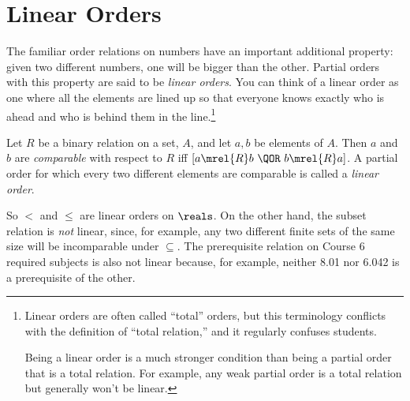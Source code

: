 \section{Linear Orders}\label{linear_order_sec}

The familiar order relations on numbers have an important additional
property: given two different numbers, one will be bigger than the
other.  Partial orders with this property are said to be \emph{linear
  orders}.  You can think of a linear order as one where all the
elements are lined up so that everyone knows exactly who is ahead and
who is behind them in the line.\footnote{Linear orders are often
  called ``total'' orders, but this terminology conflicts with the
  definition of ``total relation,'' and it regularly confuses
  students.

  Being a linear order is a much stronger condition than being a
  partial order that is a total relation.  For example, any weak
  partial order is a total relation but generally won't be linear.}

\begin{definition}\label{def:path_total}
Let $R$ be a binary relation on a set, $A$, and let $a, b$ be elements of
$A$.  Then $a$ and $b$ are \emph{comparable} with respect to $R$ iff $[a
  \mrel{R} b\ \QOR\ b \mrel{R} a]$.  A partial order for which every two
different elements are comparable is called a \emph{linear order}.
\end{definition}

So $<$ and $\le$ are linear orders on $\reals$.  On the other hand, the
subset relation is \emph{not} linear, since, for example, any two different
finite sets of the same size will be incomparable under $\subseteq$.  The
prerequisite relation on Course 6 required subjects is also not linear
because, for example, neither 8.01 nor 6.042 is a prerequisite of the
other.

\iffalse
The name linear is based on the following
\begin{lemma}\label{path_total_lem} For any
  finite, nonempty set of vertices from a linear order, there is
  a directed path going through exactly these vertices.  If
  the digraph is a DAG, the directed path is unique.
\end{lemma}
Lemma~\ref{path_total_lem} is easy to prove by induction on the size
of the set of vertices.  The proof is given in
Problem~\ref{CP_tournament_chain}.
\fi

\begin{problems}
\practiceproblems
{}

\classproblems
{}

\homeworkproblems
{}

\examproblems
{}

\end{problems}


